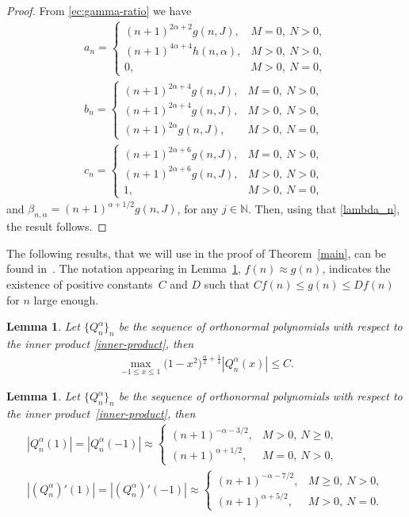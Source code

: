 \documentclass[11pt]{article}
\newtheorem{lem}[thm]{Lemma}
\numberwithin{equation}{section}
\begin{document}
\begin{proof} From \eqref{ec:gamma-ratio} we have
\begin{gather*}
a_{n}= \begin{cases}
(n+1)^{2\alpha+2}g(n,J), & M=0, \ N>0,\\
(n+1)^{4\alpha+4}h(n,\alpha), & M>0, \ N>0,\\
0, & M>0, \ N=0,
\end{cases} \\
b_{n}= \begin{cases}
(n+1)^{2\alpha+4}g(n,J), & M=0, \ N>0,\\
(n+1)^{2\alpha+4}g(n,J), & M>0, \ N>0,\\
(n+1)^{2\alpha}g(n,J), & M>0, \ N=0,
\end{cases} \\
c_{n}= \begin{cases}
(n+1)^{2\alpha+6}g(n,J), & M=0, \ N>0,\\
(n+1)^{2\alpha+6}g(n,J), & M>0, \ N>0,\\
1, & M>0, \ N=0,
\end{cases}
\end{gather*}
and $\beta_{n,\alpha}=(n+1)^{\alpha+1/2}g(n,J)$, for any $j\in \mathbb{N}$. Then, using that \eqref{lambda_n}, the result follows.
\end{proof}

The following results, that we will use in the proof of Theorem~\ref{main}, can be found in~\cite{foulquie}. The notation appearing in Lemma~\ref{extremos}, $f(n)\approx g(n)$, indicates the existence of positive constants~$C$ and $D$ such that $Cf(n)\le g(n)\le Df(n)$ for $n$ large enough.

\begin{lem}\label{acotacionQ}
	Let $\{Q_n^{\alpha}\}_n$ be the sequence of orthonormal polynomials with respect to the inner product \eqref{inner-product}, then
	\begin{gather*}
	\max_{-1\le x\le 1}\big(1-x^2\big)^{\frac{\alpha}{2}+\frac{1}{4}}|Q_n^{\alpha}(x)|\le C.
	\end{gather*}
\end{lem}

\begin{lem}\label{extremos} Let $\{Q_n^{\alpha}\}_n$ be the sequence of orthonormal polynomials with respect to the inner product~\eqref{inner-product}, then
\begin{gather*}
|Q_n^{\alpha}(1)|=|Q_n^{\alpha}(-1)|\approx \begin{cases}
(n+1)^{-\alpha-3/2}, & M>0, \ N\ge 0,\\
(n+1)^{\alpha+1/2}, & M=0, \ N>0,
\end{cases}\\
|(Q_n^{\alpha})'(1)|=|(Q_n^{\alpha})'(-1)|\approx \begin{cases}
(n+1)^{-\alpha-7/2}, & M\ge 0, \ N> 0,\\
(n+1)^{\alpha+5/2}, & M>0, \ N=0.
\end{cases}
\end{gather*}
\end{lem}
\end{document}

